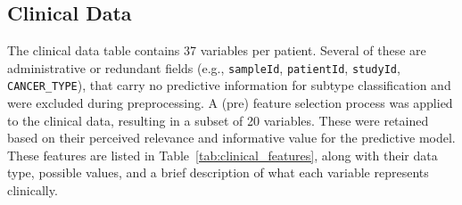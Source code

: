 \subsection{Clinical Data}
\label{subsec:clinical_data}

The clinical data table contains 37 variables per patient. Several of these
are administrative or redundant fields (e.g., \texttt{sampleId}, \texttt{patientId}, 
\texttt{studyId}, \texttt{CANCER\_TYPE}), 
that carry no predictive information for subtype classification and were excluded during
preprocessing. A (pre) feature selection process was applied to the clinical data, 
resulting in a subset of 20 variables. These were retained based on their 
perceived relevance and informative value for the predictive model. These features are listed in
Table~\ref{tab:clinical_features}, along with their data type, possible values,
and a brief description of what each variable represents clinically.

